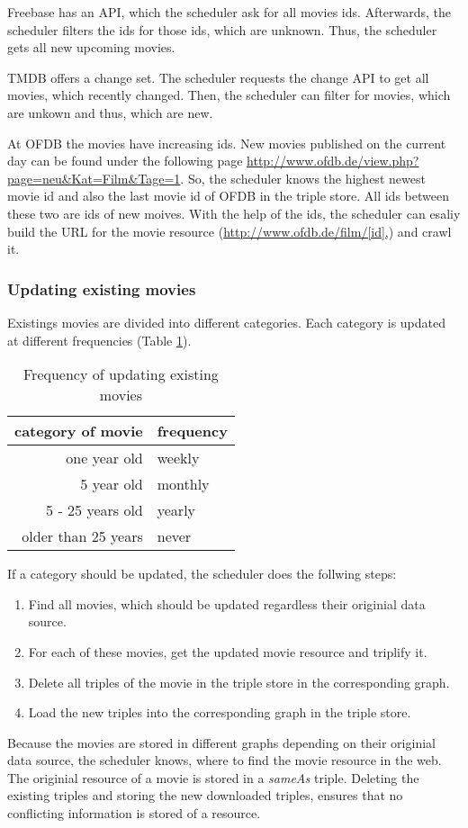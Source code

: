 Freebase has an API, which the scheduler ask for all movies ids.
Afterwards, the scheduler filters the ids for those ids, which are unknown.
Thus, the scheduler gets all new upcoming movies.

TMDB offers a change set.
The scheduler requests the change API to get all movies, which recently changed.
Then, the scheduler can filter for movies, which are unkown and thus, which are new.

At OFDB the movies have increasing ids.
New movies published on the current day can be found under the following page \url{http://www.ofdb.de/view.php?page=neu&Kat=Film&Tage=1}.
So, the scheduler knows the highest newest movie id and also the last movie id of OFDB in the triple store.
All ids between these two are ids of new moives.
With the help of the ids, the scheduler can esaliy build the URL for the movie resource (\url{http://www.ofdb.de/film/[id],}) and crawl it.

\subsubsection{Updating existing movies}
Existings movies are divided into different categories.
Each category is updated at different frequencies (Table \ref{tab_updating_existing}).
\begin{table}[h]
	\caption{Frequency of updating existing movies}
	\begin{center}
	\begin{tabular}{rl}
		\textbf{category of movie} & \textbf{frequency} \\ \hline
		one year old & weekly \\
		5 year old & monthly \\
		5 - 25 years old & yearly \\
		older than 25 years & never \\
	\end{tabular}
	\end{center}
	\label{tab_updating_existing}
\end{table}
If a category should be updated, the scheduler does the follwing steps:
\begin{enumerate}
	\item Find all movies, which should be updated regardless their originial data source.
	\item For each of these movies, get the updated movie resource and triplify it.
	\item Delete all triples of the movie in the triple store in the corresponding graph.
	\item Load the new triples into the corresponding graph in the triple store.
\end{enumerate}
Because the movies are stored in different graphs depending on their originial data source, the scheduler knows, where to find the movie resource in the web.
The originial resource of a movie is stored in a \emph{sameAs} triple.
Deleting the existing triples and storing the new downloaded triples, ensures that no conflicting information is stored of a resource.